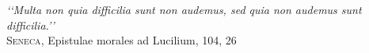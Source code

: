 \thispagestyle{empty}

\vspace*{0.3\textheight}

\begin{flushright}
	{\itshape
		\lq\lq Multa non quia difficilia sunt non audemus, sed quia non audemus 
		sunt difficilia.\rq\rq}\\
	\medskip
		\textsc{Seneca}, Epistulae morales ad Lucilium, 104, 26
\end{flushright}
